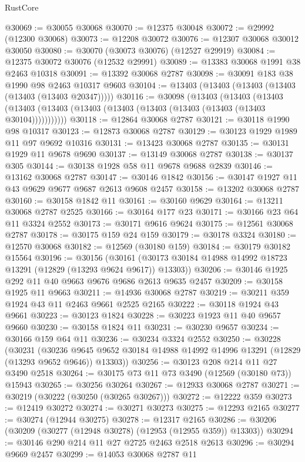 \begin{lexlean}{RustCore}
\begin{coremodule}
@30069 := @30055 @30068
@30070 := @12375 @30048
@30072 := @29992 (@12300 @30068)
@30073 := @12208 @30072
@30076 := @12307 @30068 @30012 @30050
@30080 := @30070 (@30073 @30076) (@12527 @29919)
@30084 := @12375 @30072 @30076 (@12532 @29991)
@30089 := @13383 @30068 @1991 @38 @2463 @10318
@30091 := @13392 @30068 @2787
@30098 := @30091 @183 @38 @1990 @98 @2463 @10317 @9603
@30104 := @13403 (@13403 (@13403 (@13403 (@13403 (@13403 @20347)))))
@30116 := @30098
    (@13403
      (@13403
        (@13403 (@13403 (@13403 (@13403 (@13403 (@13403 (@13403 (@13403 (@13403 @30104)))))))))))
@30118 := @12864 @30068 @2787
@30121 := @30118 @1990 @98 @10317
@30123 := @12873 @30068 @2787
@30129 := @30123 @1929 @1989 @11 @97 @9692 @10316
@30131 := @13423 @30068 @2787
@30135 := @30131 @1929 @11 @9678 @9690
@30137 := @13149 @30068 @2787
@30138 := @30137 @305
@30144 := @30138 @1928 @58 @11 @9678 @9688 @2839
@30146 := @13162 @30068 @2787
@30147 := @30146 @1842
@30156 := @30147 @1927 @11 @43 @9629 @9677 @9687 @2613 @9608 @2457
@30158 := @13202 @30068 @2787
@30160 := @30158 @1842 @11
@30161 := @30160 @9629
@30164 := @13211 @30068 @2787 @2525
@30166 := @30164 @177 @23
@30171 := @30166 @23 @64 @11 @3324 @2552
@30173 := @30171 @9616 @9624
@30175 := @12561 @30068 @2787
@30178 := @30175 @159 @24 @159
@30179 := @30178 @3324
@30180 := @12570 @30068
@30182 := @12569 (@30180 @159)
@30184 := @30179 @30182 @15564
@30196 := @30156
    (@30161 (@30173 @30184 @14988 @14992 @18723 @13291 (@12829 (@13293 @9624 @9617)) @13303))
@30206 := @30146 @1925 @292 @11 @40 @9663 @9676 @9686 @2613 @9635 @2457
@30209 := @30158 @1925 @11 @9663
@30211 := @14936 @30068 @2787
@30219 := @30211 @359 @1924 @43 @11 @2463 @9661 @2525 @2165
@30222 := @30118 @1924 @43 @9661
@30223 := @30123 @1824
@30228 := @30223 @1923 @11 @40 @9657 @9660
@30230 := @30158 @1824 @11
@30231 := @30230 @9657
@30234 := @30166 @159 @64 @11
@30236 := @30234 @3324 @2552
@30250 := @30228
    (@30231
      (@30236 @9645 @9652 @30184 @14988 @14992 @14996 @13291 (@12829 (@13293 @9652 @9646)) @13303))
@30256 := @30123 @208 @214 @11 @27 @3490 @2518
@30264 := @30175 @73 @11 @73 @3490 (@12569 (@30180 @73)) @15943
@30265 := @30256 @30264
@30267 := @12933 @30068 @2787
@30271 := @30219 (@30222 (@30250 (@30265 @30267)))
@30272 := @12222 @359
@30273 := @12419 @30272
@30274 := @30271 @30273
@30275 := @12293 @2165
@30277 := @30274 (@12944 @30275)
@30278 := @12317 @2165
@30286 := @30206 (@30209 (@30277 (@12948 @30278) (@12953 (@12955 @359)) @13303))
@30294 := @30146 @290 @214 @11 @27 @2725 @2463 @2518 @2613
@30296 := @30294 @9669 @2457
@30299 := @14053 @30068 @2787 @11

\end{coremodule}
\end{lexlean}

